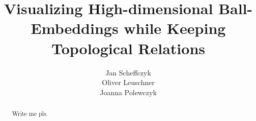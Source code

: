 \documentclass[a4paper, twoside]{report}
\title{Visualizing High-dimensional Ball-Embeddings while Keeping Topological Relations}
\author{Jan Scheffczyk \\ Oliver Leuschner \\ Joanna Polewczyk}
\begin{document}


\begin{abstract}
Write me pls.


\end{abstract}


\tableofcontents
\listoffigures











\end{document}
